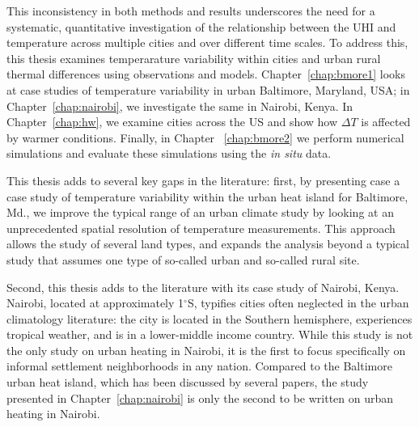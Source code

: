 This inconsistency in both methods and results
underscores the need for a systematic, quantitative investigation of the relationship between the UHI and temperature across multiple cities and over different time scales. 
To address this, this thesis examines temperarature variability within cities and urban rural thermal differences using observations and models. 
Chapter~\ref{chap:bmore1} looks at case studies of temperature variability in urban Baltimore, Maryland, USA; in Chapter~\ref{chap:nairobi}, we investigate the same in Nairobi, Kenya. In Chapter~\ref{chap:hw}, we examine cities across the US and show how $\Delta T$ is affected by warmer conditions. Finally, in Chapter~ \ref{chap:bmore2} we perform numerical simulations and evaluate these simulations using the \textit{in situ} data. 

This thesis adds to several key gaps in the literature: first, by presenting case a case study of temperature variability within the urban heat island for Baltimore, Md., we improve the typical range of an urban climate study by looking at an unprecedented spatial resolution of temperature measurements. This approach allows the study of several land types, and expands the analysis beyond a typical study that assumes one type of so-called urban and so-called rural site. 

Second, this thesis adds to the literature with its case study of Nairobi, Kenya. Nairobi, located at approximately 1$^\circ$S, typifies cities often neglected in the urban climatology literature: the city is located in the Southern hemisphere, experiences tropical weather, and is in a lower-middle income country. While this study is not the only study on urban heating in Nairobi, it is the first to focus specifically on informal settlement neighborhoods in any nation. Compared to the Baltimore urban heat island, which has been discussed by several papers, the study presented in Chapter~\ref{chap:nairobi} is only the second to be written on urban heating in Nairobi. 

